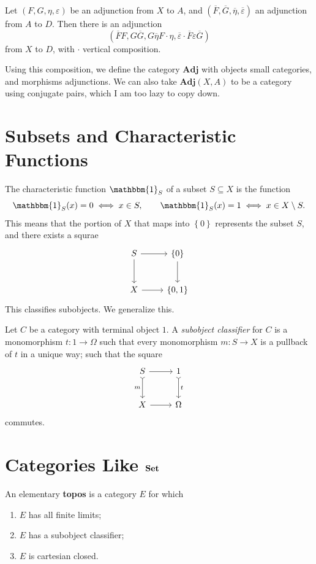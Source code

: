 \begin{theorem}\label{thm:4.7}
	Let $(F,G,\eta ,\varepsilon )$ be an adjunction from $X$ to $A$, and $(\overline{F} ,\overline{G} ,\overline{\eta } ,\overline{\varepsilon } )$ an adjunction from $A$ to $D$. Then there is an adjunction
	\[
		(\overline{F} F, G \overline{G} , G \overline{\eta } F\cdot \eta , \overline{\varepsilon } \cdot \overline{F} \varepsilon \overline{G} )
	\]
	from $X$ to $D$, with $\cdot $ vertical composition.
\end{theorem}

Using this composition, we define the category $\mathbf{Adj}$ with objects small categories, and morphisms adjunctions. We can also take $\mathbf{Adj} (X,A)$ to be a category using conjugate pairs, which I am too lazy to copy down.

\section{Subsets and Characteristic Functions}

The characteristic function $\mathbbm{1}_{S} $ of a subset $S\subseteq X$ is the function
\[
	\mathbbm{1}_{S}(x) = 0 \iff x\in S,\qquad \mathbbm{1}_{S} (x)=1 \iff x\in X\setminus S
.\]
This means that the portion of $X$ that maps into $\left\{ 0 \right\} $ represents the subset $S$, and there exists a squrae
\[\begin{tikzcd}[row sep = 2.5em, column sep = 2.5em]
S\ar[r] \ar[d]  & \left\{ 0 \right\} \ar[d]  \\
X\ar[r]  & \left\{ 0,1 \right\} 
\end{tikzcd}\]
This classifies subobjects. We generalize this.

\begin{definition}\label{dfn:4.6}
	Let $C$ be a category with terminal object $1$. A \emph{subobject classifier} for $C$ is a monomorphism $t: 1\to \Omega $ such that every monomorphism $m : S \to X$ is a pullback of $t$ in a unique way; such that the square
	\[\begin{tikzcd}[row sep = 2.5em, column sep = 2.5em]
	S\ar[r] \ar[tail, " m "', d]  & 1\ar[" t ", tail, d]  \\
	X\ar[r]  & \Omega 
	\end{tikzcd}\]
	commutes.
\end{definition}


\section{Categories Like $\mathbf{Set} $}
\begin{definition}\label{dfn:4.7}
	An elementary \textbf{topos} is a category $E$ for which
	\begin{enumerate}
		\item $E$ has all finite limits;
		\item $E$ has a subobject classifier;
		\item $E$ is cartesian closed.
	\end{enumerate}
\end{definition}


